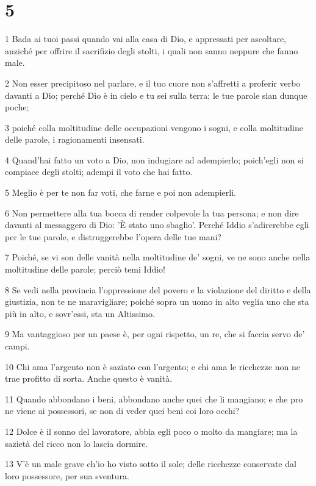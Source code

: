 \chapter{5}

\par 1 Bada ai tuoi passi quando vai alla casa di Dio, e appressati per ascoltare, anziché per offrire il sacrifizio degli stolti, i quali non sanno neppure che fanno male.
\par 2 Non esser precipitoso nel parlare, e il tuo cuore non s'affretti a proferir verbo davanti a Dio; perché Dio è in cielo e tu sei sulla terra; le tue parole sian dunque poche;
\par 3 poiché colla moltitudine delle occupazioni vengono i sogni, e colla moltitudine delle parole, i ragionamenti insensati.
\par 4 Quand'hai fatto un voto a Dio, non indugiare ad adempierlo; poich'egli non si compiace degli stolti; adempi il voto che hai fatto.
\par 5 Meglio è per te non far voti, che farne e poi non adempierli.
\par 6 Non permettere alla tua bocca di render colpevole la tua persona; e non dire davanti al messaggero di Dio: 'È stato uno sbaglio'. Perché Iddio s'adirerebbe egli per le tue parole, e distruggerebbe l'opera delle tue mani?
\par 7 Poiché, se vi son delle vanità nella moltitudine de' sogni, ve ne sono anche nella moltitudine delle parole; perciò temi Iddio!
\par 8 Se vedi nella provincia l'oppressione del povero e la violazione del diritto e della giustizia, non te ne maravigliare; poiché sopra un uomo in alto veglia uno che sta più in alto, e sovr'essi, sta un Altissimo.
\par 9 Ma vantaggioso per un paese è, per ogni rispetto, un re, che si faccia servo de' campi.
\par 10 Chi ama l'argento non è saziato con l'argento; e chi ama le ricchezze non ne trae profitto di sorta. Anche questo è vanità.
\par 11 Quando abbondano i beni, abbondano anche quei che li mangiano; e che pro ne viene ai possessori, se non di veder quei beni coi loro occhi?
\par 12 Dolce è il sonno del lavoratore, abbia egli poco o molto da mangiare; ma la sazietà del ricco non lo lascia dormire.
\par 13 V'è un male grave ch'io ho visto sotto il sole; delle ricchezze conservate dal loro possessore, per sua sventura.
